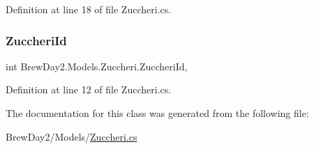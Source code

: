 Definition at line 18 of file Zuccheri.\+cs.

\mbox{\label{class_brew_day2_1_1_models_1_1_zuccheri_aedc113d2f6e282e86012199d39bb44b9}} 
\subsubsection{\texorpdfstring{Zuccheri\+Id}{ZuccheriId}}
{\footnotesize\ttfamily int Brew\+Day2.\+Models.\+Zuccheri.\+Zuccheri\+Id\hspace{0.3cm}{\ttfamily [get]}, {\ttfamily [set]}}



Definition at line 12 of file Zuccheri.\+cs.



The documentation for this class was generated from the following file\+:\begin{DoxyCompactItemize}
\item 
Brew\+Day2/\+Models/\mbox{\hyperlink{_zuccheri_8cs}{Zuccheri.\+cs}}\end{DoxyCompactItemize}
